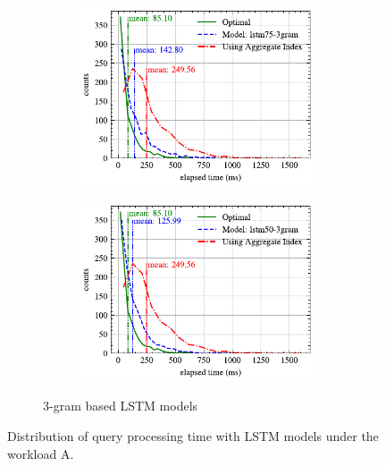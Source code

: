 \begin{figure}[!th]
\begin{subfigure}{0.45\textwidth}
\begin{subfigure}{\textwidth}
			\includegraphics[]{my/graphics/perf_dist_lstm75_3gram_A.pdf}
		\end{subfigure}
		\vfill
		\begin{subfigure}{\textwidth}
			\centering
			\includegraphics[]{my/graphics/perf_dist_lstm50_3gram_A.pdf}
		\end{subfigure}
		\caption{3-gram based LSTM models}
	\end{subfigure}
	\caption{Distribution of query processing time with LSTM models under the workload A.}
	\label{fig:lstm_perf_all_A}
\end{figure}
